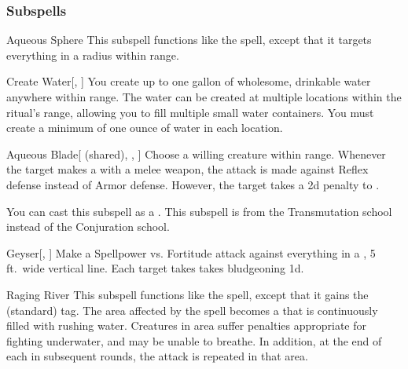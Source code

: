 \subsubsection{Subspells}


\begin{ability}[\nth{2}]{Aqueous Sphere}
This subspell functions like the  spell, except that it targets everything in a \areasmall radius within \rngclose range.
\end{ability}
\vspace{0.25em}


\begin{ability}[\nth{2}]{Create Water}[, ]
You create up to one gallon of wholesome, drinkable water anywhere within \rngclose range.
The water can be created at multiple locations within the ritual's range, allowing you to fill multiple small water containers.
You must create a minimum of one ounce of water in each location.
\end{ability}
\vspace{0.25em}


\begin{ability}[\nth{3}]{Aqueous Blade}[ (shared), , ]
Choose a willing creature within \rngclose range.
Whenever the target makes a  with a melee weapon, the attack is made against Reflex defense instead of Armor defense.
However, the target takes a \minus2d penalty to .

You can cast this subspell as a .
This subspell is from the Transmutation school instead of the Conjuration school.
\end{ability}
\vspace{0.25em}


\begin{ability}[\nth{3}]{Geyser}[, ]
Make a Spellpower vs. Fortitude attack against everything in a \arealarge, 5 ft.\ wide vertical line.
\hit Each target takes takes bludgeoning  \plus1d.
\end{ability}
\vspace{0.25em}


\begin{ability}[\nth{4}]{Raging River}
This subspell functions like the  spell, except that it gains the  (standard) tag.
The area affected by the spell becomes a  that is continuously filled with rushing water.
Creatures in area suffer penalties appropriate for fighting underwater, and may be unable to breathe.
In addition, at the end of each  in subsequent rounds, the attack is repeated in that area.
\end{ability}
\vspace{0.25em}


